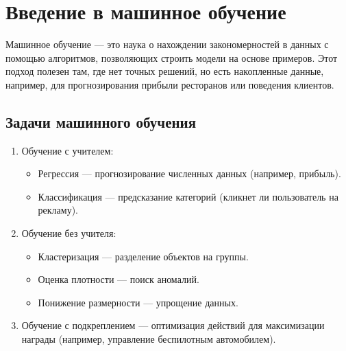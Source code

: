\hypertarget{ux432ux432ux435ux434ux435ux43dux438ux435-ux432-ux43cux430ux448ux438ux43dux43dux43eux435-ux43eux431ux443ux447ux435ux43dux438ux435}{%
\section{Введение в машинное
обучение}\label{ux432ux432ux435ux434ux435ux43dux438ux435-ux432-ux43cux430ux448ux438ux43dux43dux43eux435-ux43eux431ux443ux447ux435ux43dux438ux435}}

Машинное обучение --- это наука о нахождении закономерностей в данных с
помощью алгоритмов, позволяющих строить модели на основе примеров. Этот
подход полезен там, где нет точных решений, но есть накопленные данные,
например, для прогнозирования прибыли ресторанов или поведения клиентов.

\hypertarget{ux437ux430ux434ux430ux447ux438-ux43cux430ux448ux438ux43dux43dux43eux433ux43e-ux43eux431ux443ux447ux435ux43dux438ux44f}{%
\subsection*{Задачи машинного
обучения}\label{ux437ux430ux434ux430ux447ux438-ux43cux430ux448ux438ux43dux43dux43eux433ux43e-ux43eux431ux443ux447ux435ux43dux438ux44f}}

\begin{enumerate}
\def\labelenumi{\arabic{enumi}.}
\tightlist
\item
  Обучение с учителем:

  \begin{itemize}
  \tightlist
  \item
    Регрессия --- прогнозирование численных данных (например,
    прибыль).
  \item
    Классификация --- предсказание категорий (кликнет ли
    пользователь на рекламу).
  \end{itemize}
\item
  Обучение без учителя:

  \begin{itemize}
  \tightlist
  \item
    Кластеризация --- разделение объектов на группы.
  \item
    Оценка плотности --- поиск аномалий.
  \item
    Понижение размерности --- упрощение данных.
  \end{itemize}
\item
  Обучение с подкреплением --- оптимизация действий для
  максимизации награды (например, управление беспилотным автомобилем).
\end{enumerate}

